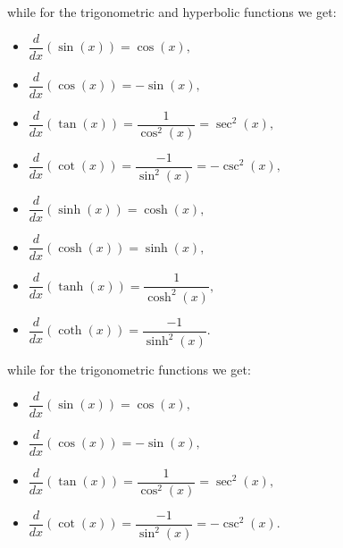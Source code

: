 \ifcourse
\ifanalysis 


while for the trigonometric and hyperbolic functions we get:

\begin{minipage}[t]{.49\linewidth}
\begin{itemize}
\item $\dfrac{d}{dx}\left(\sin(x)\right) = \cos(x),$ 
\item $\dfrac{d}{dx}\left(\cos(x)\right) = -\sin(x),$ 
\item $\dfrac{d}{dx}\left(\tan(x)\right) = \dfrac{1}{\cos^2(x)}=\sec^2(x),$ 
\item $\dfrac{d}{dx}\left(\cot(x)\right) = \dfrac{-1}{\sin^2(x)}=-\csc^2(x),$
\end{itemize}
\end{minipage}
\begin{minipage}[t]{.49\linewidth}
\begin{itemize}
\item $\dfrac{d}{dx}\left(\sinh(x)\right) = \cosh(x),$ 
\item $\dfrac{d}{dx}\left(\cosh(x)\right) = \sinh(x),$ 
\item $\dfrac{d}{dx}\left(\tanh(x)\right) = \dfrac{1}{\cosh^2(x)},$ 
\item $\dfrac{d}{dx}\left(\coth(x)\right) = \dfrac{-1}{\sinh^2(x)}.$
\end{itemize}
\end{minipage}

\fi
\fi


\ifcalculus
while for the trigonometric functions we get:

\begin{minipage}[t]{.49\linewidth}
\begin{itemize}
\item $\dfrac{d}{dx}\left(\sin(x)\right) = \cos(x),$ 
\item $\dfrac{d}{dx}\left(\cos(x)\right) = -\sin(x),$ 
\end{itemize}
\end{minipage}
\begin{minipage}[t]{.49\linewidth}
\begin{itemize}
\item $\dfrac{d}{dx}\left(\tan(x)\right) = \dfrac{1}{\cos^2(x)}=\sec^2(x),$ 
\item $\dfrac{d}{dx}\left(\cot(x)\right) = \dfrac{-1}{\sin^2(x)}=-\csc^2(x).$
\end{itemize}
\end{minipage}
\fi

